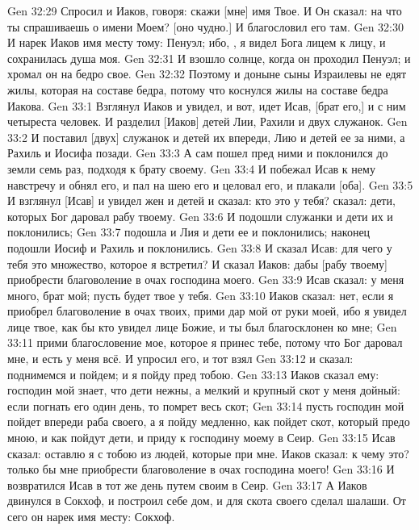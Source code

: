 \vs Gen 32:29 Спросил и Иаков, говоря: скажи [мне] имя Твое. И Он сказал: на что ты спрашиваешь о имени Моем? [оно чудно.] И благословил его там.
\vs Gen 32:30 И нарек Иаков имя месту тому: Пенуэл; ибо, , я видел Бога лицем к лицу, и сохранилась душа моя.
\vs Gen 32:31 И взошло солнце, когда он проходил Пенуэл; и хромал он на бедро свое.
\vs Gen 32:32 Поэтому и доныне сыны Израилевы не едят жилы, которая на составе бедра, потому что  коснулся жилы на составе бедра Иакова.
\vs Gen 33:1 Взглянул Иаков и увидел, и вот, идет Исав, [брат его,] и с ним четыреста человек. И разделил [Иаков] детей Лии, Рахили и двух служанок.
\vs Gen 33:2 И поставил [двух] служанок и детей их впереди, Лию и детей ее за ними, а Рахиль и Иосифа позади.
\vs Gen 33:3 А сам пошел пред ними и поклонился до земли семь раз, подходя к брату своему.
\vs Gen 33:4 И побежал Исав к нему навстречу и обнял его, и пал на шею его и целовал его, и плакали [оба].
\vs Gen 33:5 И взглянул [Исав] и увидел жен и детей и сказал: кто это у тебя?  сказал: дети, которых Бог даровал рабу твоему.
\vs Gen 33:6 И подошли служанки и дети их и поклонились;
\vs Gen 33:7 подошла и Лия и дети ее и поклонились; наконец подошли Иосиф и Рахиль и поклонились.
\vs Gen 33:8 И сказал Исав: для чего у тебя это множество, которое я встретил? И сказал Иаков: дабы [рабу твоему] приобрести благоволение в очах господина моего.
\vs Gen 33:9 Исав сказал: у меня много, брат мой; пусть будет твое у тебя.
\vs Gen 33:10 Иаков сказал: нет, если я приобрел благоволение в очах твоих, прими дар мой от руки моей, ибо я увидел лице твое, как бы кто увидел лице Божие, и ты был благосклонен ко мне;
\vs Gen 33:11 прими благословение мое, которое я принес тебе, потому что Бог даровал мне, и есть у меня всё. И упросил его, и тот взял
\vs Gen 33:12 и сказал: поднимемся и пойдем; и я пойду пред тобою.
\vs Gen 33:13 Иаков сказал ему: господин мой знает, что дети нежны, а мелкий и крупный скот у меня дойный: если погнать его один день, то помрет весь скот;
\vs Gen 33:14 пусть господин мой пойдет впереди раба своего, а я пойду медленно, как пойдет скот, который предо мною, и как пойдут дети, и приду к господину моему в Сеир.
\vs Gen 33:15 Исав сказал: оставлю я с тобою  из людей, которые при мне. Иаков сказал: к чему это? только бы мне приобрести благоволение в очах господина моего!
\vs Gen 33:16 И возвратился Исав в тот же день путем своим в Сеир.
\vs Gen 33:17 А Иаков двинулся в Сокхоф, и построил себе дом, и для скота своего сделал шалаши. От сего он нарек имя месту: Сокхоф.
